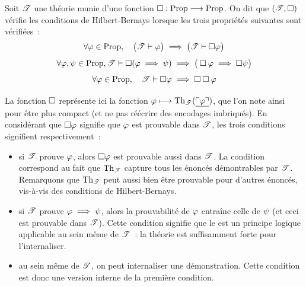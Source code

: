 \begin{definition}
  \label{def.HB.cond}
  Soit $\mathscr T$ une théorie munie d'une fonction
  $\mathbin{\square} : \displaystyle \operatorname{Prop} \longrightarrow \operatorname{Prop}$. On dit que $(\mathscr T,\mathbin{\square})$ vérifie les
  conditions de Hilbert-Bernays lorsque les trois propriétés suivantes sont
  vérifiées~:
  \begin{equation}\label{eq.HB.1}
    \forall \varphi \in \operatorname{Prop}, \quad
    \big(\mathscr T \vdash \varphi\big) \implies \big(\mathscr T \vdash \mathbin{\square}\varphi\big)
  \end{equation}
  \begin{equation}\label{eq.HB.2}
    \forall \varphi, \psi \in \operatorname{Prop}, \\
    \mathscr T \vdash \mathbin{\square}(\varphi \implies \psi) \implies
    \big( \mathbin{\square} \varphi\implies \mathbin{\square}\psi\big)
  \end{equation}
  \begin{equation}\label{eq.HB.3}
    \forall \varphi \in \operatorname{Prop}, \quad
    \mathscr T \vdash \mathbin{\square} \varphi \implies \mathbin{\square}\mathbin{\square} \varphi
  \end{equation}
  \index[notation]{$\modSq$}
\end{definition}

La fonction $\modSq$ représente ici la fonction
$\varphi\longmapsto\operatorname{Th}_{\mathscr T}(\underline{\ulcorner\varphi\urcorner})$, que l'on
note ainsi pour être plus compact (et ne pas réécrire des encodages imbriqués).
En considérant que $\mathbin{\square}\varphi$ signifie que $\varphi$ est prouvable dans
$\mathscr T$, les trois conditions signifient respectivement~:
\begin{itemize}
\item si $\mathscr T$ prouve $\varphi$, alors $\mathbin{\square}\varphi$ est prouvable aussi dans
  $\mathscr T$. La condition correspond au fait que $\operatorname{Th}_{\mathscr T}$ capture tous
  les énoncés démontrables par $\mathscr T$. Remarquons que $\operatorname{Th}_{\mathscr T}$ peut aussi
  bien être prouvable pour d'autres énoncés, vis-à-vis des conditions
  de Hilbert-Bernays.
\item si $\mathscr T$ prouve $\varphi \implies \psi$, alors la prouvabilité de
  $\varphi$ entraîne celle de $\psi$ (et ceci est prouvable dans $\mathscr T$).
  Cette condition signifie que le  est un principe
  logique applicable au sein même de $\mathscr T$~: la théorie est suffisamment
  forte pour l'internaliser.
\item au sein même de $\mathscr T$, on peut internaliser une démonstration.
  Cette condition est donc une version interne de la première condition.
\end{itemize}

